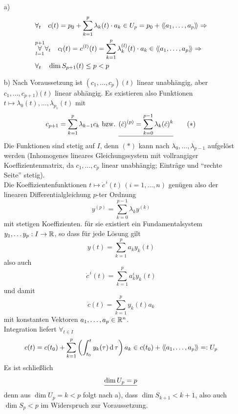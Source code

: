 \begin{beweis}
 \begin{enumerate}
  \item[a)]
  \begin{align*}
   &\forall_t \quad c(t) = p_0 + \sum_{k=1}^p \lambda_k(t) \cdot a_k \in U_p = p_0 + \left\langle\!\left\langle a_1, \dots, a_p \right\rangle\!\right\rangle \Rightarrow \\
   &\overset{p+1}{\underset{l=1}\forall} \forall_t \quad c_l(t)= c^{(l)}(t) = \sum_{k=1}^p \lambda_k^{(l)}(t)\cdot a_k \in \left\langle\!\left\langle a_1, \dots, a_p \right\rangle\!\right\rangle \Rightarrow \\
   & \forall_t \quad \dim S_{p+1}(t) \le p < p
  \end{align*}
  \item[b)] Nach Voraussetzung ist \((c_1, \dots, c_p)(t) \) linear unabhängig, aber \(c_1, \dots, c_{p+1})(t) \) linear abhängig. Es existieren also Funktionen \(t \mapsto \lambda_0(t), \dots, \lambda_{p_1}(t)\) mit 
  \begin{align*}
   c_{p+1} = \sum_{k=1}^p \lambda_{k-1} c_k \text{ bzw. } \uline{(\dot c)^{(p)} = \sum_{k=0}^{p-1} \lambda_k (\dot c)^k} \tag{\(\ast\)}
  \end{align*}
  Die Funktionen sind stetig auf \(I\), denn \((\ast)\) kann nach \(\lambda_0, \dots, \lambda_{p-1}\) aufgelöst werden (Inhomogenes lineares Gleichungssystem mit vollrangiger Koeffizientenmatrix, da \(c_1, \dots, c_p\) linear unabhängig; Einträge und "`rechte Seite"' stetig). \\
  Die Koeffizientenfunktionen \(t \mapsto \dot c^{\,i}(t) \, (i=1,\dots, n)\) genügen also der linearen Differentialgleichung \(p\)-ter Ordnung
  \[
   y^{(p)} = \sum_{k=0}^{p-1} \lambda_k y^{(k)}
  \]
  mit stetigen Koeffizienten.
  für sie existiert ein Fundamentalsystem \(y_1, \dots y_p : I \to \mathbb{R}\), so dass für jede Lösung gilt
  \[
   y(t)=\sum_{k=1}^p a_k y_k(t)
  \]
  also auch
  \[
   \dot c^{\,i}(t)=\sum_{k=1}^p a_k^i y_k(t)
  \]
  und damit
  \[
   \dot c(t)=\sum_{k=1}^p y_k(t) a_k
  \]
  mit konstanten Vektoren \(a_1, \dots, a_p \in \mathbb{R}^n\). \\
  Integration liefert \(\forall_{t \in I}\)
  \[
   c(t)= c(t_0) + \sum_{k=1}^p \left(\int_{t_0}^t y_k(\tau) \operatorname{d} \tau \right) a_k \in c(t_0) + \left\langle\!\left\langle a_1, \dots, a_p \right\rangle\!\right\rangle =: U_p
  \]
  Es ist schließlich 
  \[
  \uline{\dim U_p =p}
  \] 
  denn aus \(\dim U_p = k < p\) folgt nach a), dass \( \dim S_{k+1} < k+1 \), also auch \(\dim S_p <p\) im Widerspruch zur Voraussetzung.
 \end{enumerate}
  
\end{beweis}
